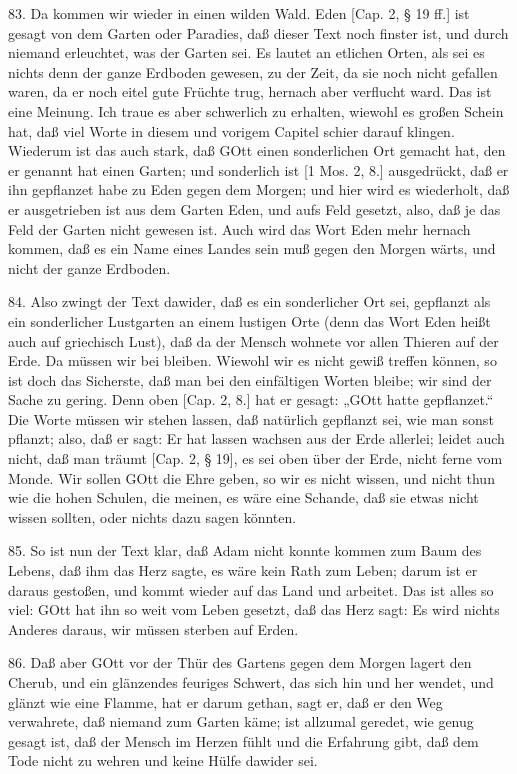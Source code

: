 83. Da kommen wir wieder in einen wilden Wald. Eden [Cap. 2, § 19 ff.] ist gesagt von dem Garten oder Paradies, daß dieser Text noch finster ist, und durch niemand erleuchtet, was der Garten sei. Es lautet an etlichen Orten, als sei es nichts denn der ganze Erdboden gewesen, zu der Zeit, da sie noch nicht gefallen waren, da er noch eitel gute Früchte trug, hernach aber verflucht ward. Das ist eine Meinung. Ich traue es aber schwerlich zu erhalten, wiewohl es großen Schein hat, daß viel Worte in diesem und vorigem Capitel schier darauf klingen. Wiederum ist das auch stark, daß GOtt einen sonderlichen Ort gemacht hat, den er genannt hat einen Garten; und sonderlich ist [1 Mos. 2, 8.] ausgedrückt, daß er ihn gepflanzet habe zu Eden gegen dem Morgen; und hier wird es wiederholt, daß er ausgetrieben ist aus dem Garten Eden, und aufs Feld gesetzt, also, daß je das Feld der Garten nicht gewesen ist. Auch wird das Wort Eden mehr hernach kommen, daß es ein Name eines Landes sein muß gegen den Morgen wärts, und nicht der ganze Erdboden.

84. Also zwingt der Text dawider, daß es ein sonderlicher Ort sei, gepflanzt als ein sonderlicher Lustgarten an einem lustigen Orte (denn das Wort Eden heißt auch auf griechisch Lust), daß da der Mensch wohnete vor allen Thieren auf der Erde. Da müssen wir bei bleiben. Wiewohl wir es nicht gewiß treffen können, so ist doch das Sicherste, daß man bei den einfältigen Worten bleibe; wir sind der Sache zu gering. Denn oben [Cap. 2, 8.] hat er gesagt: „GOtt hatte gepflanzet.“ Die Worte müssen wir stehen lassen, daß natürlich gepflanzt sei, wie man sonst pflanzt; also, daß er sagt: Er hat lassen wachsen aus der Erde allerlei; leidet auch nicht, daß man träumt [Cap. 2, § 19], es sei oben über der Erde, nicht ferne vom Monde. Wir sollen GOtt die Ehre geben, so wir es nicht wissen, und nicht thun wie die hohen Schulen, die meinen, es wäre eine Schande, daß sie etwas nicht wissen sollten, oder nichts dazu sagen könnten.

85. So ist nun der Text klar, daß Adam nicht konnte kommen zum Baum des Lebens, daß ihm das Herz sagte, es wäre kein Rath zum Leben; darum ist er daraus gestoßen, und kommt wieder auf das Land und arbeitet. Das ist alles so viel: GOtt hat ihn so weit vom Leben gesetzt, daß das Herz sagt: Es wird nichts Anderes daraus, wir müssen sterben auf Erden.

86. Daß aber GOtt vor der Thür des Gartens gegen dem Morgen lagert den Cherub, und ein glänzendes feuriges Schwert, das sich hin und her wendet, und glänzt wie eine Flamme, hat er darum gethan, sagt er, daß er den Weg verwahrete, daß niemand zum Garten käme; ist allzumal geredet, wie genug gesagt ist, daß der Mensch im Herzen fühlt und die Erfahrung gibt, daß dem Tode nicht zu wehren und keine Hülfe dawider sei.

